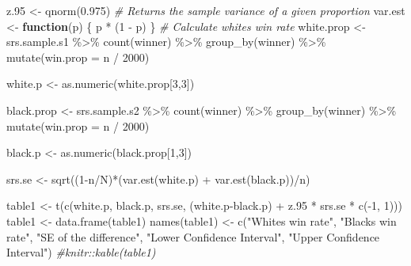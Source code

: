\documentclass[11pt,]{article}
\newenvironment{Shaded}{\begin{snugshade}}{\end{snugshade}}
\newcommand{\AttributeTok}[1]{\textcolor[rgb]{0.77,0.63,0.00}{#1}}
\newcommand{\CommentTok}[1]{\textcolor[rgb]{0.56,0.35,0.01}{\textit{#1}}}
\newcommand{\ControlFlowTok}[1]{\textcolor[rgb]{0.13,0.29,0.53}{\textbf{#1}}}
\newcommand{\DecValTok}[1]{\textcolor[rgb]{0.00,0.00,0.81}{#1}}
\newcommand{\FloatTok}[1]{\textcolor[rgb]{0.00,0.00,0.81}{#1}}
\newcommand{\FunctionTok}[1]{\textcolor[rgb]{0.00,0.00,0.00}{#1}}
\newcommand{\NormalTok}[1]{#1}
\newcommand{\OtherTok}[1]{\textcolor[rgb]{0.56,0.35,0.01}{#1}}
\newcommand{\SpecialCharTok}[1]{\textcolor[rgb]{0.00,0.00,0.00}{#1}}
\newcommand{\StringTok}[1]{\textcolor[rgb]{0.31,0.60,0.02}{#1}}
\begin{document}
\begin{Shaded}
\begin{Highlighting}[]
\NormalTok{z}\FloatTok{.95} \OtherTok{\textless{}{-}} \FunctionTok{qnorm}\NormalTok{(}\FloatTok{0.975}\NormalTok{)}
\CommentTok{\# Returns the sample variance of a given proportion}
\NormalTok{var.est }\OtherTok{\textless{}{-}} \ControlFlowTok{function}\NormalTok{(p) \{}
\NormalTok{  p }\SpecialCharTok{*}\NormalTok{ (}\DecValTok{1} \SpecialCharTok{{-}}\NormalTok{ p)}
\NormalTok{\}}
\CommentTok{\# Calculate white\textquotesingle{}s win rate}
\NormalTok{white.prop }\OtherTok{\textless{}{-}}\NormalTok{ srs.sample.s1 }\SpecialCharTok{\%\textgreater{}\%}
  \FunctionTok{count}\NormalTok{(winner) }\SpecialCharTok{\%\textgreater{}\%}
  \FunctionTok{group\_by}\NormalTok{(winner) }\SpecialCharTok{\%\textgreater{}\%}
  \FunctionTok{mutate}\NormalTok{(}\AttributeTok{win.prop =}\NormalTok{ n }\SpecialCharTok{/} \DecValTok{2000}\NormalTok{)}

\NormalTok{white.p }\OtherTok{\textless{}{-}} \FunctionTok{as.numeric}\NormalTok{(white.prop[}\DecValTok{3}\NormalTok{,}\DecValTok{3}\NormalTok{])}

\NormalTok{black.prop }\OtherTok{\textless{}{-}}\NormalTok{ srs.sample.s2 }\SpecialCharTok{\%\textgreater{}\%}
  \FunctionTok{count}\NormalTok{(winner) }\SpecialCharTok{\%\textgreater{}\%}
  \FunctionTok{group\_by}\NormalTok{(winner) }\SpecialCharTok{\%\textgreater{}\%}
  \FunctionTok{mutate}\NormalTok{(}\AttributeTok{win.prop =}\NormalTok{ n }\SpecialCharTok{/} \DecValTok{2000}\NormalTok{)}

\NormalTok{black.p }\OtherTok{\textless{}{-}} \FunctionTok{as.numeric}\NormalTok{(black.prop[}\DecValTok{1}\NormalTok{,}\DecValTok{3}\NormalTok{])}

\NormalTok{srs.se }\OtherTok{\textless{}{-}} \FunctionTok{sqrt}\NormalTok{((}\DecValTok{1}\SpecialCharTok{{-}}\NormalTok{n}\SpecialCharTok{/}\NormalTok{N)}\SpecialCharTok{*}\NormalTok{(}\FunctionTok{var.est}\NormalTok{(white.p) }\SpecialCharTok{+} \FunctionTok{var.est}\NormalTok{(black.p))}\SpecialCharTok{/}\NormalTok{n)}


\NormalTok{table1 }\OtherTok{\textless{}{-}} \FunctionTok{t}\NormalTok{(}\FunctionTok{c}\NormalTok{(white.p, black.p, srs.se, (white.p}\SpecialCharTok{{-}}\NormalTok{black.p) }\SpecialCharTok{+}\NormalTok{ z}\FloatTok{.95} \SpecialCharTok{*}\NormalTok{ srs.se }\SpecialCharTok{*} \FunctionTok{c}\NormalTok{(}\SpecialCharTok{{-}}\DecValTok{1}\NormalTok{, }\DecValTok{1}\NormalTok{)))}
\NormalTok{table1 }\OtherTok{\textless{}{-}} \FunctionTok{data.frame}\NormalTok{(table1)}
\FunctionTok{names}\NormalTok{(table1) }\OtherTok{\textless{}{-}} \FunctionTok{c}\NormalTok{(}\StringTok{"White\textquotesingle{}s win rate"}\NormalTok{, }\StringTok{"Black\textquotesingle{}s win rate"}\NormalTok{, }\StringTok{"SE of the difference"}\NormalTok{, }\StringTok{"Lower Confidence Interval"}\NormalTok{, }\StringTok{"Upper Confidence Interval"}\NormalTok{)}
\CommentTok{\#knitr::kable(table1)}
\end{Highlighting}
\end{Shaded}
\end{document}
